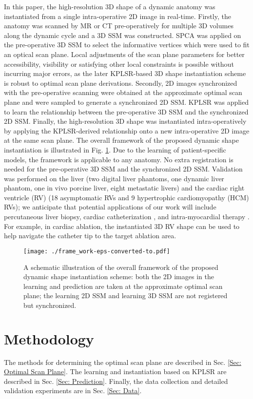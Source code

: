 \documentclass[review]{elsarticle}
\begin{document}
In this paper, the high-resolution 3D shape of a dynamic anatomy was instantiated from a single intra-operative 2D image in real-time. Firstly, the anatomy was scanned by MR or CT pre-operatively for multiple 3D volumes along the dynamic cycle and a 3D SSM was constructed. SPCA was applied on the pre-operative 3D SSM to select the informative vertices which were used to fit an optical scan plane. Local adjustments of the scan plane parameters for better accessibility, visibility or satisfying other local constraints is possible without incurring major errors, as the later KPLSR-based 3D shape instantiation scheme is robust to optimal scan plane derivations. Secondly, 2D images synchronized with the pre-operative scanning were obtained at the approximate optimal scan plane and were sampled to generate a synchronized 2D SSM. KPLSR was applied to learn the relationship between the pre-operative 3D SSM and the synchronized 2D SSM. Finally, the high-resolution 3D shape was instantiated intra-operatively by applying the KPLSR-derived relationship onto a new intra-operative 2D image at the same scan plane. The overall framework of the proposed dynamic shape instantiation is illustrated in Fig. \ref{fig:frame_work}. Due to the learning of patient-specific models, the framework is applicable to any anatomy. No extra registration is needed for the pre-operative 3D SSM and the synchronized 2D SSM. Validation was performed on the liver (two digital liver phantoms, one dynamic liver phantom, one in vivo porcine liver, eight metastatic livers) and the cardiac right ventricle (RV) (18 asymptomatic RVs and 9 hypertrophic cardiomyopathy (HCM) RVs); we anticipate that potential applications of our work will include percutaneous liver biopsy, cardiac catheterization \citep{razavi2003cardiac}, and intra-myocardial therapy \citep{saeed2005mri}. For example, in cardiac ablation, the instantiated 3D RV shape can be used to help navigate the catheter tip to the target ablation area.

\begin{figure}[thpb]
\centering
\texttt{[image: ./frame\_work-eps-converted-to.pdf]}
\caption{A schematic illustration of the overall framework of the proposed dynamic shape instantiation scheme: both the 2D images in the learning and prediction are taken at the approximate optimal scan plane; the learning 2D SSM and learning 3D SSM are not registered but synchronized.}
\label{fig:frame_work}
\end{figure}

\section{Methodology}
The methods for determining the optimal scan plane are described in Sec. \ref{Sec: Optimal Scan Plane}. The learning and instantiation based on KPLSR are described in Sec. \ref{Sec: Prediction}. Finally, the data collection and detailed validation experiments are in Sec. \ref{Sec: Data}.
\end{document}
